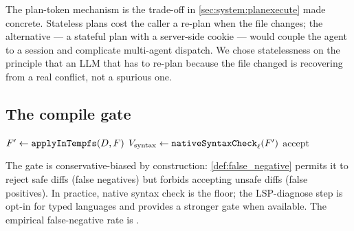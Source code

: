 \begin{remark}
The plan-token mechanism is the trade-off in
\cref{sec:system:planexecute} made concrete. Stateless plans cost the
caller a re-plan when the file changes; the alternative --- a
stateful plan with a server-side cookie --- would couple the agent
to a session and complicate multi-agent dispatch. We chose
statelessness on the principle that an LLM that has to re-plan
because the file changed is recovering from a real conflict, not a
spurious one.
\end{remark}

\subsection{The compile gate}
\label{sec:algorithm:gate}

\begin{algorithm}[H]
$F' \leftarrow \texttt{applyInTempfs}(D, F)$\;
$V_{\text{syntax}} \leftarrow \texttt{nativeSyntaxCheck}_\ell(F')$\;
\Return $\text{accept}$\;
\caption{The compile-gate verdict. The temp-fs apply ensures the gate
  never touches the working tree; the candidate is materialised in a
  read-only scratch directory and discarded after the verdict.}
\label{alg:gate}
\end{algorithm}

The gate is conservative-biased by construction:
\cref{def:false_negative} permits it to reject safe diffs (false
negatives) but forbids accepting unsafe diffs (false positives). In
practice, native syntax check is the floor; the LSP-diagnose step is
opt-in for typed languages and provides a stronger gate when
available. The empirical false-negative rate is
.
